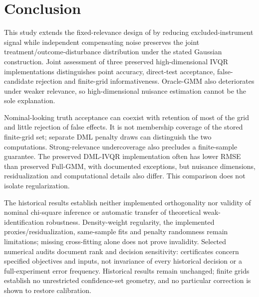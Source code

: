 \section{Conclusion}
This study extends the fixed-relevance design of \textcite{chen_huang_tien_2021} by reducing excluded-instrument signal while independent compensating noise preserves the joint treatment/outcome-disturbance distribution under the stated Gaussian construction. Joint assessment of three preserved high-dimensional IVQR implementations distinguishes point accuracy, direct-test acceptance, false-candidate rejection and finite-grid informativeness. Oracle-GMM also deteriorates under weaker relevance, so high-dimensional nuisance estimation cannot be the sole explanation.

Nominal-looking truth acceptance can coexist with retention of most of the grid and little rejection of false effects. It is not membership coverage of the stored finite-grid set; separate DML penalty draws can distinguish the two computations. Strong-relevance undercoverage also precludes a finite-sample guarantee. The preserved DML-IVQR implementation often has lower RMSE than preserved Full-GMM, with documented exceptions, but nuisance dimensions, residualization and computational details also differ. This comparison does not isolate regularization.

The historical results establish neither implemented orthogonality nor validity of nominal chi-square inference or automatic transfer of theoretical weak-identification robustness. Density-weight regularity, the implemented proxies/residualization, same-sample fits and penalty randomness remain limitations; missing cross-fitting alone does not prove invalidity. Selected numerical audits document rank and decision sensitivity: certificates concern specified objectives and inputs, not invariance of every historical decision or a full-experiment error frequency. Historical results remain unchanged; finite grids establish no unrestricted confidence-set geometry, and no particular correction is shown to restore calibration.
